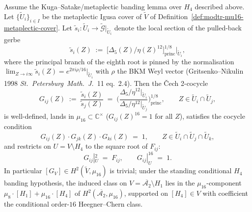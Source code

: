 \begin{theorem}
\label{thm:modtr-mu16-metaplectic-banding-cocycle}
Assume the Kuga--Satake/metaplectic banding lemma over $H_4$ described
above. Let $\{\widetilde U_i\}_{i\in I}$ be the metaplectic Igusa cover of
$\widetilde V$ of Definition~\ref{def:modtr-mu16-metaplectic-cover}.
Let $\widetilde s_i\colon\widetilde U_i\to\widetilde{\mathcal G}|_{\widetilde U_i}$
denote the local section of the pulled-back gerbe
\[
 \widetilde s_i(Z) \;:=\; \bigl[\Delta_5(Z)/\eta(Z)^{12}\bigr]^{1/8}_{\mathrm{princ}}|_{\widetilde U_i},
\]
where the principal branch of the eighth root is pinned by the
normalisation
$\lim_{Z\to i\infty}\widetilde s_i(Z) = e^{2\pi i\rho/16}|_{\widetilde U_i}$
with $\rho$ the BKM Weyl vector (Gritsenko--Nikulin 1998
\emph{St.~Petersburg~Math.~J.}~11 eq.~2.4). Then the \v Cech 2-cocycle
\[
 \boxed{\;
 G_{ij}(Z) \;:=\;
 \frac{\widetilde s_i(Z)}{\widetilde s_j(Z)}
 \;=\;
 \biggl(\frac{\Delta_5/\eta^{12}|_{\widetilde U_i}}
 {\Delta_5/\eta^{12}|_{\widetilde U_j}}\biggr)^{1/8}_{\mathrm{princ}},
 \qquad Z\in\widetilde U_i\cap\widetilde U_j,
 \;}
\]
is well-defined, lands in $\mu_{16}\subset\mathbb C^\times$
($G_{ij}(Z)^{16} = 1$ for all $Z$), satisfies the cocycle condition
\[
 G_{ij}(Z)\cdot G_{jk}(Z)\cdot G_{ki}(Z) \;=\; 1,
 \qquad Z\in \widetilde U_i\cap\widetilde U_j\cap\widetilde U_k,
\]
and restricts on $U = V\setminus H_4$ to the square root of $F_{ij}$:
\[
 G_{ij}|_U^2 \;=\; F_{ij},
 \qquad G_{ij}|_U^{16} \;=\; 1.
\]
In particular $[G_V]\in H^2(\widetilde V,\mu_{16})$ is trivial; under
the standing conditional $H_4$ banding hypothesis, the induced class on
$V = \overline{\mathcal A_2}\setminus H_1$ lies in the
$\mu_{16}$-component
$\mu_8\cdot[H_1] + \mu_{16}\cdot[H_4]$ of
$H^2(\overline{\mathcal A_2},\mu_{16})$, supported on
$[H_4]\in V$ with coefficient the conditional order-$16$
Heegner--Chern class.
\end{theorem}


